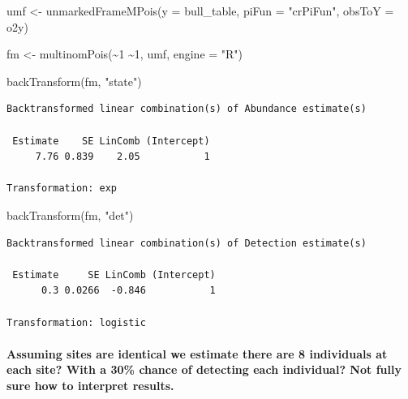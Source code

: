 \documentclass[
  letterpaper,
  DIV=11,
  numbers=noendperiod]{scrartcl}
\let\oldparagraph\paragraph
\renewcommand{\paragraph}[1]{\oldparagraph{#1}\mbox{}}
\newenvironment{Shaded}{\begin{snugshade}}{\end{snugshade}}
\newcommand{\AttributeTok}[1]{\textcolor[rgb]{0.40,0.45,0.13}{#1}}
\newcommand{\DecValTok}[1]{\textcolor[rgb]{0.68,0.00,0.00}{#1}}
\newcommand{\FunctionTok}[1]{\textcolor[rgb]{0.28,0.35,0.67}{#1}}
\newcommand{\NormalTok}[1]{\textcolor[rgb]{0.00,0.23,0.31}{#1}}
\newcommand{\OtherTok}[1]{\textcolor[rgb]{0.00,0.23,0.31}{#1}}
\newcommand{\SpecialCharTok}[1]{\textcolor[rgb]{0.37,0.37,0.37}{#1}}
\newcommand{\StringTok}[1]{\textcolor[rgb]{0.13,0.47,0.30}{#1}}
\begin{document}
\begin{Shaded}
\begin{Highlighting}[]
\NormalTok{umf }\OtherTok{\textless{}{-}} \FunctionTok{unmarkedFrameMPois}\NormalTok{(}\AttributeTok{y =}\NormalTok{ bull\_table, }\AttributeTok{piFun =} \StringTok{"crPiFun"}\NormalTok{, }\AttributeTok{obsToY =}\NormalTok{ o2y)}

\NormalTok{fm }\OtherTok{\textless{}{-}} \FunctionTok{multinomPois}\NormalTok{(}\SpecialCharTok{\textasciitilde{}}\DecValTok{1} \SpecialCharTok{\textasciitilde{}}\DecValTok{1}\NormalTok{, umf, }\AttributeTok{engine =} \StringTok{"R"}\NormalTok{)}

\FunctionTok{backTransform}\NormalTok{(fm, }\StringTok{"state"}\NormalTok{)}
\end{Highlighting}
\end{Shaded}

\begin{verbatim}
Backtransformed linear combination(s) of Abundance estimate(s)

 Estimate    SE LinComb (Intercept)
     7.76 0.839    2.05           1

Transformation: exp 
\end{verbatim}

\begin{Shaded}
\begin{Highlighting}[]
\FunctionTok{backTransform}\NormalTok{(fm, }\StringTok{"det"}\NormalTok{)}
\end{Highlighting}
\end{Shaded}

\begin{verbatim}
Backtransformed linear combination(s) of Detection estimate(s)

 Estimate     SE LinComb (Intercept)
      0.3 0.0266  -0.846           1

Transformation: logistic 
\end{verbatim}

\hypertarget{assuming-sites-are-identical-we-estimate-there-are-8-individuals-at-each-site-with-a-30-chance-of-detecting-each-individual-not-fully-sure-how-to-interpret-results.}{%
\paragraph{Assuming sites are identical we estimate there are 8
individuals at each site? With a 30\% chance of detecting each
individual? Not fully sure how to interpret
results.}\label{assuming-sites-are-identical-we-estimate-there-are-8-individuals-at-each-site-with-a-30-chance-of-detecting-each-individual-not-fully-sure-how-to-interpret-results.}}
\end{document}
